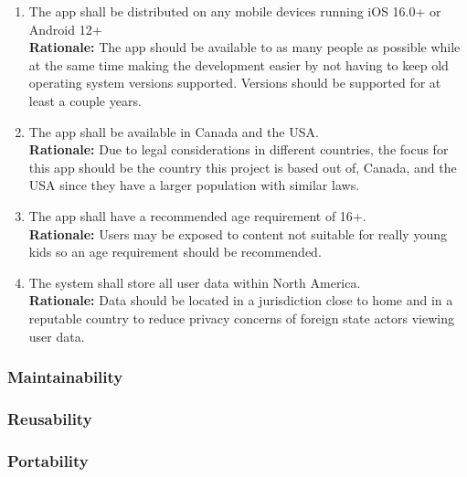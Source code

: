 \documentclass{article}
\begin{document}
\begin{enumerate}[align=left, label=\textbf{DI-D\arabic*.}]
    \item The app shall be distributed on any mobile devices running iOS 16.0+ or Android 12+\\
    {\bf Rationale:} The app should be available to as many people as possible while at the same time making the development easier by not having to keep old operating system versions supported. Versions should be supported for at least a couple years.
    \item The app shall be available in Canada and the USA.\\
    {\bf Rationale:} Due to legal considerations in different countries, the focus for this app should be the country this project is based out of, Canada, and the USA since they have a larger population with similar laws.
    \item The app shall have a recommended age requirement of 16+.\\
    {\bf Rationale:} Users may be exposed to content not suitable for really young kids so an age requirement should be recommended.
    \item The system shall store all user data within North America.\\
    {\bf Rationale:} Data should be located in a jurisdiction close to home and in a reputable country to reduce privacy concerns of foreign state actors viewing user data.
\end{enumerate}

\subsubsection{Maintainability}


\subsubsection{Reusability}

\subsubsection{Portability}
\label{ssub:portability}
\end{document}
